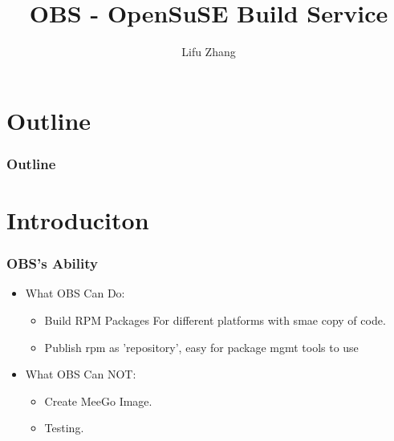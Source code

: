 \documentclass{beamer}
\title{OBS - OpenSuSE Build Service}
\institute{Elektrobit Wireless(2010)}
\author{Lifu Zhang}
\date{}
\begin{document}


\maketitle

\section*{Outline}
\begin{frame}
  \frametitle{Outline}
  \tableofcontents
\end{frame}

\section{Introduciton}
\begin{frame}
  \frametitle{OBS's Ability}
  \begin{itemize}
    \item What OBS Can Do:
      \begin{itemize}
	\item Build RPM Packages For different platforms with smae copy of code.
	\item Publish rpm as 'repository', easy for package mgmt tools to use
      \end{itemize}
    \item What OBS Can NOT:
      \begin{itemize}
	\item Create MeeGo Image.
	\item Testing.
      \end{itemize}
  \end{itemize}
\end{frame}
\end{document}
